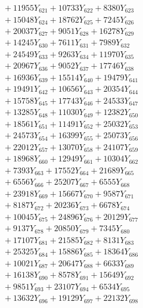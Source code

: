 \documentclass[a4paper,10pt]{article}
\begin{document}
{\begin{align}
&\;  + 11955 Y_{621} + 10733 Y_{622} + 8380 Y_{623} \\[0.3ex]
&\;  + 15048 Y_{624} + 18762 Y_{625} + 7245 Y_{626} \\[0.3ex]
&\;  + 20037 Y_{627} + 9051 Y_{628} + 16278 Y_{629} \\[0.5ex]\allowbreak
&\;  + 14245 Y_{630} + 7611 Y_{631} + 7989 Y_{632} \\[0.3ex]
&\;  + 24549 Y_{633} + 9263 Y_{634} + 11970 Y_{635} \\[0.3ex]
&\;  + 20967 Y_{636} + 9052 Y_{637} + 17746 Y_{638} \\[0.3ex]
&\;  + 16936 Y_{639} + 15514 Y_{640} + 19479 Y_{641} \\[0.3ex]
&\;  + 19491 Y_{642} + 10656 Y_{643} + 20354 Y_{644} \\[0.3ex]
&\;  + 15758 Y_{645} + 17743 Y_{646} + 24533 Y_{647} \\[0.3ex]
&\;  + 13285 Y_{648} + 11030 Y_{649} + 12382 Y_{650} \\[0.3ex]
&\;  + 18561 Y_{651} + 11491 Y_{652} + 25032 Y_{653} \\[0.3ex]
&\;  + 24573 Y_{654} + 16399 Y_{655} + 25073 Y_{656} \\[0.3ex]
&\;  + 22012 Y_{657} + 13070 Y_{658} + 24107 Y_{659} \\[0.5ex]\allowbreak
&\;  + 18968 Y_{660} + 12949 Y_{661} + 10304 Y_{662} \\[0.3ex]
&\;  + 7393 Y_{663} + 17552 Y_{664} + 21689 Y_{665} \\[0.3ex]
&\;  + 6556 Y_{666} + 25207 Y_{667} + 6555 Y_{668} \\[0.3ex]
&\;  + 23918 Y_{669} + 15667 Y_{670} + 9587 Y_{671} \\[0.3ex]
&\;  + 8187 Y_{672} + 20236 Y_{673} + 6678 Y_{674} \\[0.3ex]
&\;  + 10045 Y_{675} + 24896 Y_{676} + 20129 Y_{677} \\[0.3ex]
&\;  + 9137 Y_{678} + 20850 Y_{679} + 7345 Y_{680} \\[0.3ex]
&\;  + 17107 Y_{681} + 21585 Y_{682} + 8131 Y_{683} \\[0.3ex]
&\;  + 25325 Y_{684} + 15886 Y_{685} + 18364 Y_{686} \\[0.3ex]
&\;  + 10021 Y_{687} + 20647 Y_{688} + 6633 Y_{689} \\[0.5ex]\allowbreak
&\;  + 16138 Y_{690} + 8578 Y_{691} + 15649 Y_{692} \\[0.3ex]
&\;  + 9851 Y_{693} + 23107 Y_{694} + 6534 Y_{695} \\[0.3ex]
&\;  + 13632 Y_{696} + 19129 Y_{697} + 22132 Y_{698} \\[0.3ex]

\end{align}}
\end{document}
